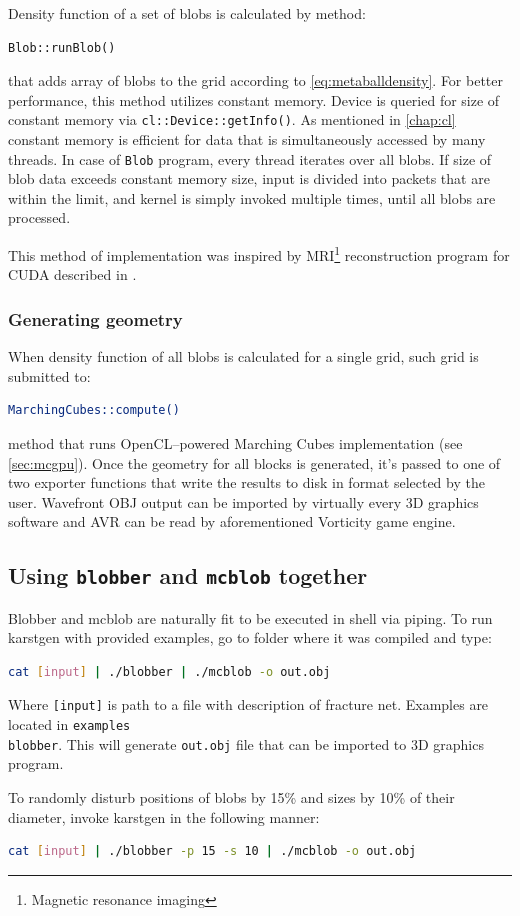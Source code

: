 Density function of a set of blobs is calculated by method:
\begin{lstlisting}[numbers=none]
Blob::runBlob()
\end{lstlisting}
that adds array of blobs to the grid according to \autoref{eq:metaballdensity}.
For better performance, this method utilizes constant memory. Device is queried
for size of constant memory via \texttt{cl::Device::getInfo()}. As
mentioned in \autoref{chap:cl} constant memory is efficient for data that is
simultaneously accessed by many threads. In case of \texttt{Blob} program,
every thread iterates over all blobs. If size of blob data exceeds constant
memory size, input is divided into packets that are within the limit, and kernel
is simply invoked multiple times, until all blobs are processed.

This method of implementation was inspired by MRI\footnote{Magnetic resonance imaging}
reconstruction program for CUDA described in \cite[in chapter~8]{Kirk:2010:PMP:1841511}.

\subsubsection{Generating geometry}

When density function of all blobs is calculated for a single grid, such grid
is submitted to:
\begin{lstlisting}[language=bash,numbers=none]
MarchingCubes::compute()
\end{lstlisting}
method that runs OpenCL--powered
Marching Cubes implementation (see \autoref{sec:mcgpu}). Once the geometry for
all blocks is generated, it's passed to one of two exporter functions that write
the results to disk in format selected by the user. Wavefront OBJ output can be
imported by virtually every 3D graphics software and AVR can be read by aforementioned
Vorticity game engine.

\subsection{Using \texttt{blobber} and \texttt{mcblob} together}

Blobber and mcblob are naturally fit to be executed in shell via piping. To
run karstgen with provided examples, go to folder where it was compiled and
type:
\begin{lstlisting}[language=bash,numbers=none]
cat [input] | ./blobber | ./mcblob -o out.obj
\end{lstlisting}
Where \texttt{[input]} is path to a file with description of fracture net.
Examples are located in \texttt{examples\\blobber}.
This will generate \texttt{out.obj} file that can be imported to 3D graphics
program.

To randomly disturb positions of blobs by 15\% and sizes by 10\% of their
diameter, invoke karstgen in the following manner:
\begin{lstlisting}[language=bash,numbers=none]
cat [input] | ./blobber -p 15 -s 10 | ./mcblob -o out.obj
\end{lstlisting}

